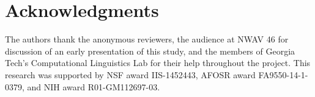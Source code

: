 \section*{Acknowledgments}
The authors thank the anonymous reviewers, the audience at NWAV 46 for discussion of an early presentation of this study, and the members of Georgia Tech's Computational Linguistics Lab for their help throughout the project. This research was supported by NSF award IIS-1452443, AFOSR award FA9550-14-1-0379, and NIH award R01-GM112697-03.
